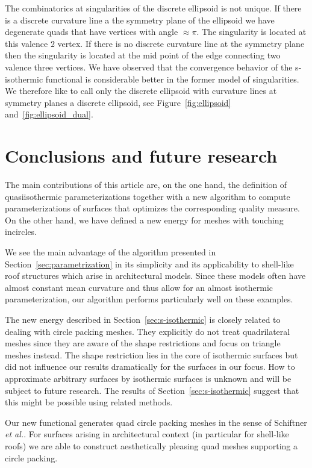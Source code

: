 \documentclass[Thesis.tex]{subfiles}
\begin{document}
The combinatorics at singularities of the discrete ellipsoid is not unique. If there is a discrete 
curvature line a the symmetry plane of the ellipsoid we have degenerate quads that have 
vertices with angle $\approx\pi$. The singularity is located at this valence $2$ vertex. 
If there is no discrete curvature line at the symmetry plane then the singularity is located at the 
mid point of the edge connecting two valence three vertices. We have observed that 
the convergence behavior of the s-isothermic functional is considerable better in the former 
model of singularities. We therefore like to call only the discrete ellipsoid with curvature 
lines at symmetry planes a discrete ellipsoid, see Figure~\ref{fig:ellipsoid} and~\ref{fig:ellipsoid_dual}.



\section{Conclusions and future research}
\label{sec:future}
The main contributions of this article are, on the one hand, the definition of 
quasiisothermic parameterizations together with a new algorithm to
compute parameterizations of surfaces that optimizes the corresponding quality measure.
On the other hand, we have defined a new energy for meshes with touching incircles.

We see the main advantage of the algorithm presented in
Section~\ref{sec:parametrization} in its simplicity and its applicability to
shell-like roof structures which arise in architectural models. Since these
models often have almost constant mean curvature and thus allow for an almost
isothermic parameterization, our algorithm performs particularly well on these
examples.

The new energy described in Section~\ref{sec:s-isothermic} is closely related
to \cite{SchiftnerHWP2009} dealing with
circle packing meshes. They explicitly do not treat quadrilateral meshes since
they are aware of the shape restrictions and focus on triangle meshes instead.
The shape restriction lies in the core of isothermic surfaces but
did not influence our results dramatically for the surfaces in our focus. How
to approximate arbitrary surfaces by isothermic surfaces is unknown and will be
subject to future research. The results of Section~\ref{sec:s-isothermic}
suggest that this might be possible using related methods.

Our new functional generates quad circle packing meshes in the sense of
Schiftner \emph{et al.}. For surfaces arising in architectural context (in
particular for shell-like roofs) we are able to construct aesthetically
pleasing quad meshes supporting a circle packing. 

\subfilebibliography
\end{document}

